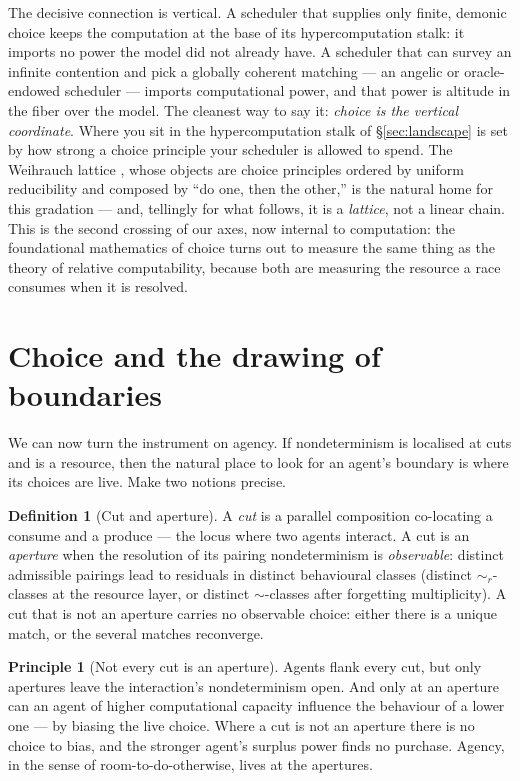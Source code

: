 \documentclass[11pt]{article}
\theoremstyle{definition}
\newtheorem{definition}{Definition}
\newtheorem{principle}{Principle}
\theoremstyle{plain}
\theoremstyle{remark}
\newcommand{\bisim}{\sim}
\newcommand{\rbisim}{\sim_{r}}
\begin{document}
\noindent
The decisive connection is vertical. A scheduler that supplies only finite,
demonic choice keeps the computation at the base of its hypercomputation stalk: it
imports no power the model did not already have. A scheduler that can survey an
infinite contention and pick a globally coherent matching --- an angelic or
oracle-endowed scheduler --- imports computational power, and that power is altitude
in the fiber over the model. The cleanest way to say it: \emph{choice is the vertical
coordinate}. Where you sit in the hypercomputation stalk of \S\ref{sec:landscape} is
set by how strong a choice principle your scheduler is allowed to spend. The Weihrauch
lattice \cite{weihrauch}, whose objects are choice principles ordered by uniform
reducibility and composed by ``do one, then the other,'' is the natural home for this
gradation --- and, tellingly for what follows, it is a \emph{lattice}, not a linear
chain. This is the second crossing of our axes, now internal to computation: the
foundational mathematics of choice turns out to measure the same thing as the
theory of relative computability, because both are measuring the resource a race
consumes when it is resolved.

\section{Choice and the drawing of boundaries}\label{sec:boundaries}

We can now turn the instrument on agency. If nondeterminism is localised at cuts and
is a resource, then the natural place to look for an agent's boundary is where its
choices are live. Make two notions precise.

\begin{definition}[Cut and aperture]\label{def:aperture}
A \emph{cut} is a parallel composition co-locating a consume and a produce --- the
locus where two agents interact. A cut is an \emph{aperture} when the resolution of
its pairing nondeterminism is \emph{observable}: distinct admissible pairings lead to
residuals in distinct behavioural classes (distinct $\rbisim$-classes at the resource
layer, or distinct $\bisim$-classes after forgetting multiplicity). A cut that is not
an aperture carries no observable choice: either there is a unique match, or the
several matches reconverge.
\end{definition}

\begin{principle}[Not every cut is an aperture]\label{prin:main}
Agents flank every cut, but only apertures leave the interaction's nondeterminism
open. And only at an aperture can an agent of higher computational capacity influence
the behaviour of a lower one --- by biasing the live choice. Where a cut is not an
aperture there is no choice to bias, and the stronger agent's surplus power finds no
purchase. Agency, in the sense of room-to-do-otherwise, lives at the apertures.
\end{principle}
\end{document}
